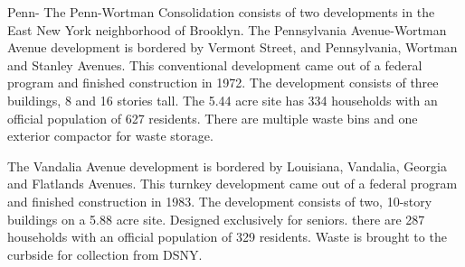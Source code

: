 Penn-
The Penn-Wortman Consolidation consists of two developments in the East New York neighborhood of Brooklyn. The Pennsylvania Avenue-Wortman Avenue development is bordered by Vermont Street, and Pennsylvania, Wortman and Stanley Avenues. This conventional development came out of a federal program and finished construction in 1972. The development consists of three buildings, 8 and 16 stories tall. The 5.44 acre site has 334 households with an official population of 627 residents. There are multiple waste bins and one exterior compactor for waste storage.

The Vandalia Avenue development is bordered by Louisiana, Vandalia, Georgia and Flatlands Avenues. This turnkey development came out of a federal program and finished construction in 1983. The development consists of two, 10-story buildings on a 5.88 acre site. Designed exclusively for seniors. there are 287 households with an official population of 329 residents. Waste is brought to the curbside for collection from DSNY.